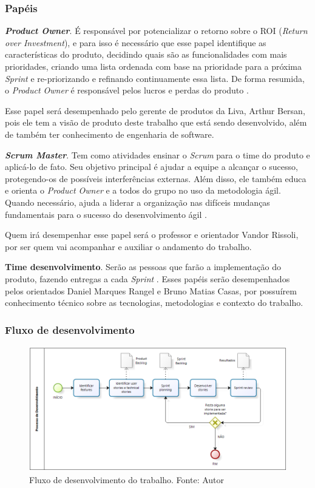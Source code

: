 \subsubsection{Papéis}

\textbf{\textit{Product Owner}}. É responsável por potencializar o retorno sobre o ROI (\textit{Return over Investment}), e para isso é necessário que esse papel identifique as características do produto, decidindo quais são as funcionalidades com mais prioridades, criando uma lista ordenada com base na prioridade para a próxima \textit{Sprint} e re-priorizando e refinando continuamente essa lista. De forma resumida, o \textit{Product Owner} é responsável pelos lucros e perdas do produto \cite{Sutherland}.

Esse papel será desempenhado pelo gerente de produtos da Liva, Arthur Bersan, pois ele tem a visão de produto deste trabalho que está sendo desenvolvido, além de também ter conhecimento de engenharia de software.

\textbf{\textit{Scrum Master}}. Tem como atividades ensinar o \textit{Scrum} para o time do produto e aplicá-lo de fato. Seu objetivo principal é ajudar a equipe a alcançar o sucesso, protegendo-os de possíveis interferências externas. Além disso, ele também educa e  orienta o \textit{Product Owner} e a todos do grupo no uso da metodologia ágil. Quando necessário, ajuda a liderar a organização nas difíceis mudanças fundamentais para o sucesso do desenvolvimento ágil \cite{Sutherland}.
	
Quem irá desempenhar esse papel será o professor e orientador Vandor Rissoli, por ser quem vai acompanhar e auxiliar o andamento do trabalho.

\textbf{Time desenvolvimento}. Serão as pessoas que farão a implementação do produto, fazendo entregas a cada \textit{Sprint} \cite{Sutherland}. Esses papéis serão desempenhados pelos orientados Daniel Marques Rangel e Bruno Matias Casas, por possuírem conhecimento técnico sobre as tecnologias, metodologias e contexto do trabalho.

\subsubsection{Fluxo de desenvolvimento}

\begin{figure}[H]
    \centering
    \includegraphics[scale=0.6]{figuras/proposta/fluxo_scrum.png}
    \caption[Fluxo de desenvolvimento do trabalho]{Fluxo de desenvolvimento do trabalho. Fonte: Autor}
    \label{fig:fluxo_scrum}
\end{figure}

